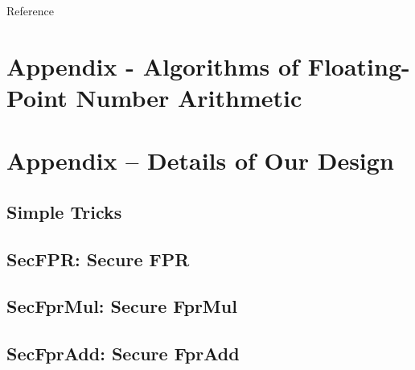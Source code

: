 \begin{frame}[allowframebreaks]{Reference}


\printbibliography[title=Reference]

\end{frame}

\appendix
\backupbegin

\section{Appendix - Algorithms of Floating-Point Number Arithmetic}
\label{sec:appendix-fpu}


\section{Appendix – Details of Our Design}
\label{sec:appendix}

\subsection{Simple Tricks}


\subsection{SecFPR: Secure FPR}


\subsection{SecFprMul: Secure FprMul}


\subsection{SecFprAdd: Secure FprAdd}


\backupend

